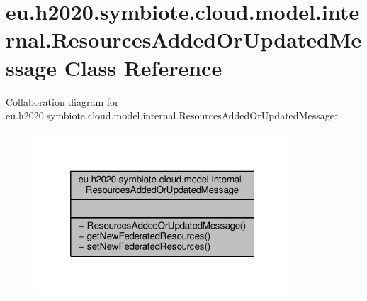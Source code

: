 \hypertarget{classeu_1_1h2020_1_1symbiote_1_1cloud_1_1model_1_1internal_1_1ResourcesAddedOrUpdatedMessage}{}\section{eu.\+h2020.\+symbiote.\+cloud.\+model.\+internal.\+Resources\+Added\+Or\+Updated\+Message Class Reference}
\label{classeu_1_1h2020_1_1symbiote_1_1cloud_1_1model_1_1internal_1_1ResourcesAddedOrUpdatedMessage}


Collaboration diagram for eu.\+h2020.\+symbiote.\+cloud.\+model.\+internal.\+Resources\+Added\+Or\+Updated\+Message\+:
\nopagebreak
\begin{figure}[H]
\begin{center}
\leavevmode
\includegraphics[width=272pt]{classeu_1_1h2020_1_1symbiote_1_1cloud_1_1model_1_1internal_1_1ResourcesAddedOrUpdatedMessage__coll__graph}
\end{center}
\end{figure}
